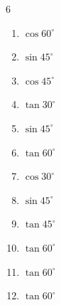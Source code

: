\begin{multicols}{6}
\begin{enumerate}

  \item $\displaystyle \cos{60^\circ}$


  \item $\displaystyle \sin{45^\circ}$


  \item $\displaystyle \cos{45^\circ}$


  \item $\displaystyle \tan{30^\circ}$


  \item $\displaystyle \sin{45^\circ}$


\columnbreak %

  \item $\displaystyle \tan{60^\circ}$


  \item $\displaystyle \cos{30^\circ}$


  \item $\displaystyle \sin{45^\circ}$


  \item $\displaystyle \tan{45^\circ}$

        \phantom{$\displaystyle =1$}

  \item $\displaystyle \tan{60^\circ}$


  \item $\displaystyle \tan{60^\circ}$


  \item $\displaystyle \tan{60^\circ}$



\end{enumerate}
\end{multicols}

